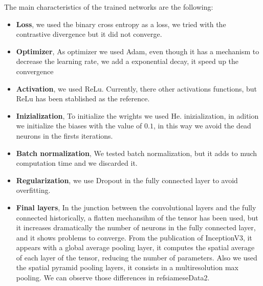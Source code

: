 The main characteristics of the trained networks are the following:

\begin{itemize}

\item \textbf{Loss}, we used the binary cross entropy as a loss, we tried with the contrastive divergence but it did not converge.

\item \textbf{Optimizer}, As optimizer we used Adam, even though it has a mechanism to decrease the learning rate, we add a exponential decay, it speed up the convergence

\item \textbf{Activation}, we used ReLu. Currently, there other activations functions, but ReLu has been stablished as the reference.

\item \textbf{Inizialization}, To initialize the wrights we used He. inizialization, in adition we initialize the biases with the value of $0.1$, in this way we avoid the dead neurons in the firsts iterations.

\item \textbf{Batch normalization}, We tested batch normalization, but it adds to much computation time and we discarded it.

\item \textbf{Regularization}, we use Dropout in the fully connected layer to avoid overfitting.


\item \textbf{Final layers}, In the junction between the convolutional layers and the fully connected historically, a flatten mechansihm of the tensor has been used, but it increases dramatically the number of neurons in the fully connected layer, and it shows problems to converge. From the publication of InceptionV3, it appears with a global average pooling layer, it computes the spatial average of each layer of the tensor, reducing the number of parameters. Also we used the spatial pyramid pooling layers, it consists in a multiresolution max pooling. We can observe those differences in ref{siameseData2}.

\begin{figure}[H]
		
\centering


\end{figure}
\end{itemize}
